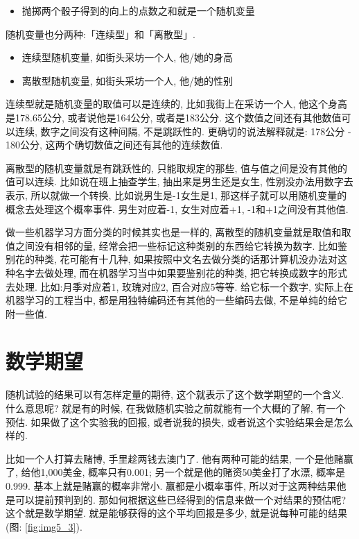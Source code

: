 \begin{itemize}
  \item 抛掷两个骰子得到的向上的点数之和就是一个随机变量
\end{itemize}

随机变量也分两种:「连续型」和「离散型」. 
\begin{itemize}
  \item 连续型随机变量, 如街头采坊一个人, 他/她的身高
  \item 离散型随机变量, 如街头采坊一个人, 他/她的性别
\end{itemize}

连续型就是随机变量的取值可以是连续的, 比如我街上在采访一个人, 他这个身高是178.65公分, 或者说他是164公分, 或者是183公分. 这个数值之间还有其他数值可以连续, 数字之间没有这种间隔, 不是跳跃性的. 更确切的说法解释就是: 178公分 - 180公分, 这两个确切数值之间还有其他的连续数值. 

离散型的随机变量就是有跳跃性的, 只能取规定的那些, 值与值之间是没有其他的值可以连续. 比如说在班上抽查学生, 抽出来是男生还是女生, 性别没办法用数字去表示, 所以就做一个转换, 比如说男生是-1女生是1, 那这样子就可以用随机变量的概念去处理这个概率事件. 男生对应着-1, 女生对应着+1, -1和+1之间没有其他值. 

做一些机器学习方面分类的时候其实也是一样的, 离散型的随机变量就是取值和取值之间没有相邻的量, 经常会把一些标记这种类别的东西给它转换为数字. 比如鉴别花的种类, 花可能有十几种, 如果按照中文名去做分类的话那计算机没办法对这种名字去做处理, 而在机器学习当中如果要鉴别花的种类, 把它转换成数字的形式去处理. 比如:月季对应着1, 玫瑰对应2, 百合对应5等等. 给它标一个数字, 实际上在机器学习的工程当中, 都是用独特编码还有其他的一些编码去做, 不是单纯的给它附一些值. 

\section{数学期望}

随机试验的结果可以有怎样定量的期待, 这个就表示了这个数学期望的一个含义. 什么意思呢? 就是有的时候, 在我做随机实验之前就能有一个大概的了解, 有一个预估. 如果做了这个实验我的回报, 或者说我的损失, 或者说这个实验结果会是怎么样的. 

比如一个人打算去赌博, 手里趁两钱去澳门了. 他有两种可能的结果, 一个是他赌赢了, 给他1,000美金, 概率只有0.001; 另一个就是他的赌资50美金打了水漂, 概率是0.999. 基本上就是赌赢的概率非常小. 赢都是小概率事件, 所以对于这两种结果他是可以提前预判到的. 那如何根据这些已经得到的信息来做一个对结果的预估呢? 这个就是数学期望. 就是能够获得的这个平均回报是多少, 就是说每种可能的结果(图: \ref{fig:img5_3}). 

